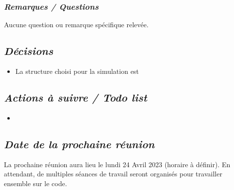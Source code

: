 \documentclass[french,a4paper]{article}
\begin{document}
\subsubsection*{\textit{Remarques / Questions}}
Aucune question ou remarque spécifique relevée.

\subsection*{\textit{Décisions}}
\begin{itemize}
  \item La structure choisi pour la simulation est 
\end{itemize}

\subsection*{\textit{Actions à suivre / Todo list}}
\begin{itemize}
  \item 
\end{itemize}

\subsection*{\textit{Date de la prochaine réunion}}
La prochaine réunion aura lieu le lundi 24 Avril 2023 (horaire à définir). 
En attendant, de multiples séances de travail seront organisés pour travailler ensemble sur le code.
\end{document}
